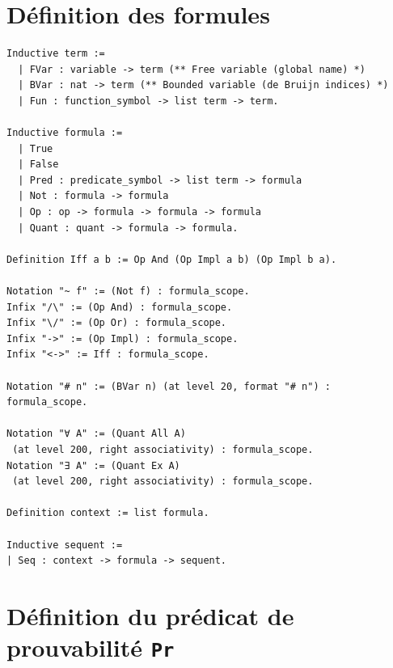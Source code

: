 \documentclass[a4paper]{article}
\begin{document}
\section{Définition des formules} \label{form}

\begin{verbatim}
Inductive term :=
  | FVar : variable -> term (** Free variable (global name) *)
  | BVar : nat -> term (** Bounded variable (de Bruijn indices) *)
  | Fun : function_symbol -> list term -> term.

Inductive formula :=
  | True
  | False
  | Pred : predicate_symbol -> list term -> formula
  | Not : formula -> formula
  | Op : op -> formula -> formula -> formula
  | Quant : quant -> formula -> formula.
  
Definition Iff a b := Op And (Op Impl a b) (Op Impl b a). 

Notation "~ f" := (Not f) : formula_scope.
Infix "/\" := (Op And) : formula_scope.
Infix "\/" := (Op Or) : formula_scope.
Infix "->" := (Op Impl) : formula_scope.
Infix "<->" := Iff : formula_scope.

Notation "# n" := (BVar n) (at level 20, format "# n") : formula_scope.

Notation "∀ A" := (Quant All A)
 (at level 200, right associativity) : formula_scope.
Notation "∃ A" := (Quant Ex A)
 (at level 200, right associativity) : formula_scope.
 
Definition context := list formula.

Inductive sequent :=
| Seq : context -> formula -> sequent.
\end{verbatim}

\section{Définition du prédicat de prouvabilité \texttt{Pr}} \label{pr}
\end{document}
